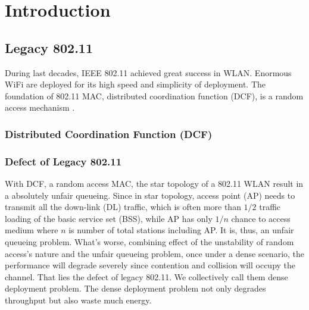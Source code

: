 \chapter{Introduction}
\label{c:intro}

\section{Legacy 802.11}
During last decades, IEEE 802.11 achieved great success in WLAN. Enormous WiFi are deployed for its high speed and simplicity of deployment. 
The foundation of 802.11 MAC, distributed coordination function (DCF), is a random access mechanism \cite{bianchi2000performance}. 

\subsection{Distributed Coordination Function (DCF)}


\subsection{Defect of Legacy 802.11}

With DCF, a random access MAC, the star topology of a 802.11 WLAN result in a absolutely unfair queueing. 
Since in star topology,  access point (AP) needs to transmit all the down-link (DL) traffic, which is often more than $1/2$ traffic loading of the basic service set (BSS), while AP has only $1/n$ chance to access medium where $n$ is number of total stations including AP. It is, thus, an unfair queueing problem.
What's worse, combining effect of the unstability of random access's nature and the unfair queueing problem, once under a dense scenario, the performance will degrade severely since contention and collision will occupy the channel.
That lies the defect of legacy 802.11.
We collectively call them dense deployment problem.
The dense deployment problem not only degrades throughput but also waste much energy.

